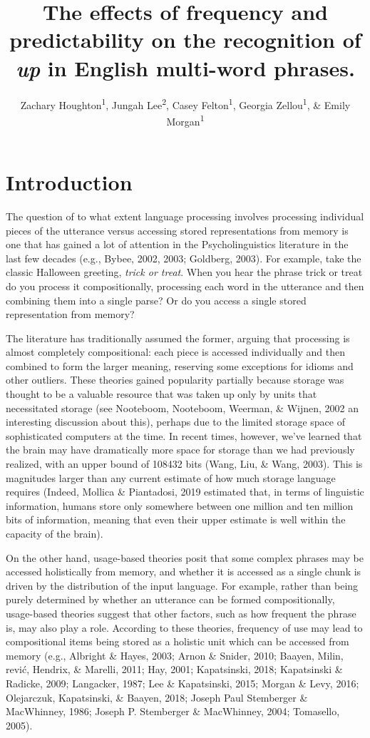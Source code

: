 \documentclass[
  man,floatsintext]{apa6}
\title{The effects of frequency and predictability on the recognition of \emph{up} in English multi-word phrases.}
\author{Zachary Houghton\textsuperscript{1}, Jungah Lee\textsuperscript{2}, Casey Felton\textsuperscript{1}, Georgia Zellou\textsuperscript{1}, \& Emily Morgan\textsuperscript{1}}
\date{}
\affiliation{\vspace{0.5cm}\textsuperscript{1} University of California, Davis\\\textsuperscript{2} Chosun University}
\begin{document}
\maketitle

\hypertarget{introduction}{%
\section{Introduction}\label{introduction}}

The question of to what extent language processing involves processing individual pieces of the utterance versus accessing stored representations from memory is one that has gained a lot of attention in the Psycholinguistics literature in the last few decades (e.g., Bybee, 2002, 2003; Goldberg, 2003). For example, take the classic Halloween greeting, \emph{trick or treat}. When you hear the phrase trick or treat do you process it compositionally, processing each word in the utterance and then combining them into a single parse? Or do you access a single stored representation from memory?

The literature has traditionally assumed the former, arguing that processing is almost completely compositional: each piece is accessed individually and then combined to form the larger meaning, reserving some exceptions for idioms and other outliers. These theories gained popularity partially because storage was thought to be a valuable resource that was taken up only by units that necessitated storage (see Nooteboom, Nooteboom, Weerman, \& Wijnen, 2002 an interesting discussion about this), perhaps due to the limited storage space of sophisticated computers at the time. In recent times, however, we've learned that the brain may have dramatically more space for storage than we had previously realized, with an upper bound of 108432 bits (Wang, Liu, \& Wang, 2003). This is magnitudes larger than any current estimate of how much storage language requires (Indeed, Mollica \& Piantadosi, 2019 estimated that, in terms of linguistic information, humans store only somewhere between one million and ten million bits of information, meaning that even their upper estimate is well within the capacity of the brain).

On the other hand, usage-based theories posit that some complex phrases may be accessed holistically from memory, and whether it is accessed as a single chunk is driven by the distribution of the input language. For example, rather than being purely determined by whether an utterance can be formed compositionally, usage-based theories suggest that other factors, such as how frequent the phrase is, may also play a role. According to these theories, frequency of use may lead to compositional items being stored as a holistic unit which can be accessed from memory (e.g., Albright \& Hayes, 2003; Arnon \& Snider, 2010; Baayen, Milin, rević, Hendrix, \& Marelli, 2011; Hay, 2001; Kapatsinski, 2018; Kapatsinski \& Radicke, 2009; Langacker, 1987; Lee \& Kapatsinski, 2015; Morgan \& Levy, 2016; Olejarczuk, Kapatsinski, \& Baayen, 2018; Joseph Paul Stemberger \& MacWhinney, 1986; Joseph P. Stemberger \& MacWhinney, 2004; Tomasello, 2005).
\end{document}
